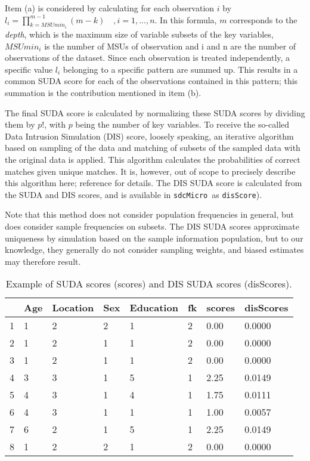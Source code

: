 \documentclass[12pt]{scrartcl}\usepackage[]{graphicx}\usepackage[]{color}
\newcommand{\sdcMicro}{\texttt{sdcMicro}}
\begin{document}
Item (a) is considered by calculating for each observation $i$ by $l_i = \prod_{k=MSUmin_i}^{m-1} (m-k) \quad, i=1,...,n$. In this formula, $m$ corresponds to the \textit{depth}, which is the maximum size of variable subsets of the key variables, $MSUmin_i$ is the number of MSUs of observation and i and n are the number of observations of the dataset. Since each observation is treated independently, a specific value $l_i$ belonging to a specific pattern are summed up. This results in a common SUDA score for each of the observations contained in this pattern; this summation is the contribution mentioned in item (b).

The final SUDA score is calculated by normalizing these SUDA scores by dividing them by $p!$, with $p$ being the number of key variables. To receive the so-called Data Intrusion Simulation (DIS) score, loosely speaking, an iterative algorithm based on sampling of the data and matching of subsets of the sampled data with the original data is applied. This algorithm calculates the probabilities of correct matches given unique matches. It is, however, out of scope to precisely describe this algorithm here; reference \cite{Elliot00} for details. The DIS SUDA score is calculated from the SUDA and DIS scores, and is available in \sdcMicro \ as \texttt{disScore}).

Note that this method does not consider population frequencies in general, but does consider sample frequencies on subsets. The DIS SUDA scores approximate uniqueness by simulation based on the sample information population, but to our knowledge, they generally do not consider sampling weights, and biased estimates may therefore result.

\begin{small}
\begin{table}[ht]
\centering
\caption{Example of SUDA scores (scores) and DIS SUDA scores (disScores).}
\label{listingsuda}
\begin{tabular}{|l|llll|l|ll|}
\hline
& Age & Location & Sex & Education & fk & scores & disScores \\
\hline
1 & 1 & 2 & 2 & 1 & 2 & 0.00 & 0.0000 \\
2 & 1 & 2 & 1 & 1 & 2 & 0.00 & 0.0000 \\
3 & 1 & 2 & 1 & 1 & 2 & 0.00 & 0.0000 \\
4 & 3 & 3 & 1 & 5 & 1 & 2.25 & 0.0149 \\
5 & 4 & 3 & 1 & 4 & 1 & 1.75 & 0.0111 \\
6 & 4 & 3 & 1 & 1 & 1 & 1.00 & 0.0057 \\
7 & 6 & 2 & 1 & 5 & 1 & 2.25 & 0.0149 \\
8 & 1 & 2 & 2 & 1 & 2 & 0.00 & 0.0000 \\
\hline
\end{tabular}
\end{table}\end{small}
\end{document}
